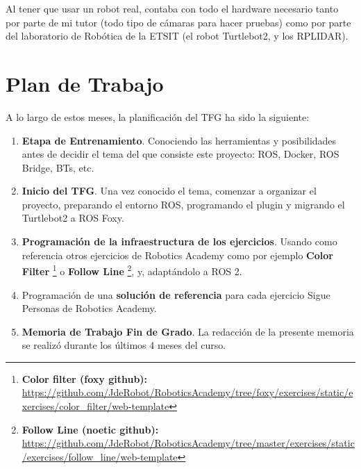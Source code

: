 Al tener que usar un robot real, contaba con todo el hardware necesario tanto por parte de mi tutor (todo tipo de cámaras para hacer pruebas) como por parte del laboratorio de Robótica de la ETSIT (el robot Turtlebot2, y los RPLIDAR).


\section{Plan de Trabajo}
\label{sec:plan_trabajo}
A lo largo de estos meses, la planificación del TFG ha sido la siguiente:

\begin{enumerate}
	\item \textbf{Etapa de Entrenamiento}. Conociendo las herramientas y posibilidades antes de decidir el tema del que consiste este proyecto: ROS, Docker, ROS Bridge, BTs, etc.
	\item \textbf{Inicio del TFG}. Una vez conocido el tema, comenzar a organizar el proyecto, preparando el entorno ROS, programando el plugin y migrando el Turtlebot2 a ROS Foxy.
	\item \textbf{Programación de la infraestructura de los ejercicios}. Usando como referencia otros ejercicios de Robotics Academy como por ejemplo \textbf{Color Filter} \footnote{\textbf{Color filter (foxy github):} \url{https://github.com/JdeRobot/RoboticsAcademy/tree/foxy/exercises/static/exercises/color_filter/web-template}} o \textbf{Follow Line} \footnote{\textbf{Follow Line (noetic github):} \url{https://github.com/JdeRobot/RoboticsAcademy/tree/master/exercises/static/exercises/follow_line/web-template}}, y, adaptándolo a ROS 2.
	\item Programación de una \textbf{solución de referencia} para cada ejercicio Sigue Personas de Robotics Academy.
	\item \textbf{Memoria de Trabajo Fin de Grado}. La redacción de la presente memoria se realizó durante los últimos 4 meses del curso. 
\end{enumerate}


